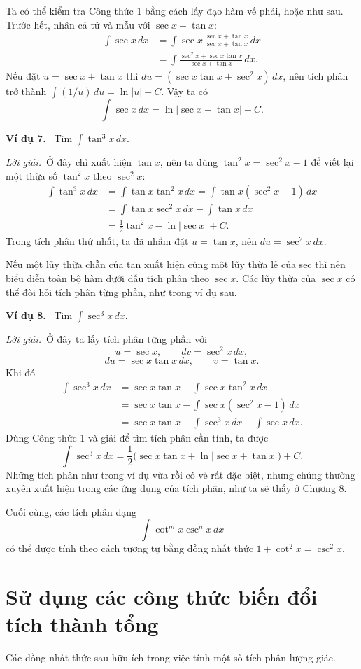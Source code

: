 \documentclass[12pt,a4paper]{article}
\newcommand{\ex}[1]{\par\medskip\noindent\textbf{Ví dụ #1.}\ }
\newcommand{\sol}{\par\nopagebreak[4]\noindent\textit{Lời giải.}\ }
\begin{document}
Ta có thể kiểm tra Công thức 1 bằng cách lấy đạo hàm vế phải, hoặc như sau. Trước hết, nhân cả tử và mẫu với $\sec x+\tan x$:
\begin{align*}
\int\sec x\,dx&=\int\sec x\,\frac{\sec x+\tan x}{\sec x+\tan x}\,dx\\
&=\int\frac{\sec^2x+\sec x\tan x}{\sec x+\tan x}\,dx.
\end{align*}
Nếu đặt $u=\sec x+\tan x$ thì $du=(\sec x\tan x+\sec^2x)\,dx$, nên tích phân trở thành $\int(1/u)\,du=\ln|u|+C$. Vậy ta có
\[\int\sec x\,dx=\ln|\sec x+\tan x|+C.\]

\ex{7} Tìm $\displaystyle\int\tan^3x\,dx$.
\sol Ở đây chỉ xuất hiện $\tan x$, nên ta dùng $\tan^2x=\sec^2x-1$ để viết lại một thừa số $\tan^2x$ theo $\sec^2x$:
\begin{align*}
\int\tan^3x\,dx&=\int\tan x\tan^2x\,dx=\int\tan x(\sec^2x-1)\,dx\\
&=\int\tan x\sec^2x\,dx-\int\tan x\,dx\\
&=\frac12\tan^2x-\ln|\sec x|+C.
\end{align*}
Trong tích phân thứ nhất, ta đã nhẩm đặt $u=\tan x$, nên $du=\sec^2x\,dx$.

Nếu một lũy thừa chẵn của tan xuất hiện cùng một lũy thừa lẻ của sec thì nên biểu diễn toàn bộ hàm dưới dấu tích phân theo $\sec x$. Các lũy thừa của $\sec x$ có thể đòi hỏi tích phân từng phần, như trong ví dụ sau.

\ex{8} Tìm $\displaystyle\int\sec^3x\,dx$.
\sol Ở đây ta lấy tích phân từng phần với
\[u=\sec x,\qquad dv=\sec^2x\,dx,\]
\[du=\sec x\tan x\,dx,\qquad v=\tan x.\]
Khi đó
\begin{align*}
\int\sec^3x\,dx&=\sec x\tan x-\int\sec x\tan^2x\,dx\\
&=\sec x\tan x-\int\sec x(\sec^2x-1)\,dx\\
&=\sec x\tan x-\int\sec^3x\,dx+\int\sec x\,dx.
\end{align*}
Dùng Công thức 1 và giải để tìm tích phân cần tính, ta được
\[\int\sec^3x\,dx=\frac12\big(\sec x\tan x+\ln|\sec x+\tan x|\big)+C.\]
Những tích phân như trong ví dụ vừa rồi có vẻ rất đặc biệt, nhưng chúng thường xuyên xuất hiện trong các ứng dụng của tích phân, như ta sẽ thấy ở Chương 8.

Cuối cùng, các tích phân dạng
\[\int\cot^mx\csc^nx\,dx\]
có thể được tính theo cách tương tự bằng đồng nhất thức $1+\cot^2x=\csc^2x$.

\section*{Sử dụng các công thức biến đổi tích thành tổng}
Các đồng nhất thức sau hữu ích trong việc tính một số tích phân lượng giác.
\end{document}
